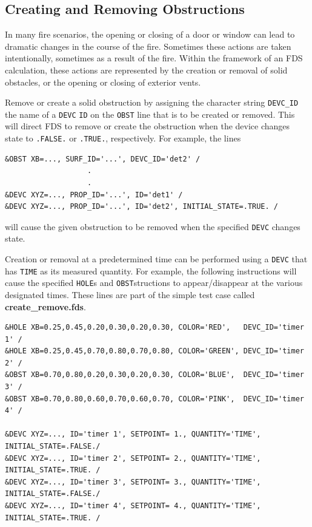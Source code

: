 \documentclass[11pt]{book}
\newcommand{\ct}{\tt\small}
\begin{document}
\subsection{Creating and Removing Obstructions}
\label{info:create_remove}

In many fire scenarios, the opening or closing of a door or window
can lead to dramatic changes in the course of the fire. Sometimes these
actions are taken intentionally, sometimes as a result of the fire.
Within the framework of an FDS calculation, these actions are
represented by the creation or removal of solid obstacles, or the
opening or closing of exterior vents.

Remove or create a solid obstruction by assigning the character string {\ct DEVC\_ID} the name of
a {\ct DEVC} {\ct ID} on the {\ct OBST} line that is to be created or removed.  This will direct
FDS to remove or create the obstruction when
the device changes state to {\ct .FALSE.} or {\ct .TRUE.}, respectively. For example, the lines

\footnotesize
\begin{verbatim}
&OBST XB=..., SURF_ID='...', DEVC_ID='det2' /
                   .
                   .
&DEVC XYZ=..., PROP_ID='...', ID='det1' /
&DEVC XYZ=..., PROP_ID='...', ID='det2', INITIAL_STATE=.TRUE. /
\end{verbatim}
\normalsize

\noindent
will cause the given obstruction to be removed when the specified {\ct DEVC} changes state.

Creation or removal at a predetermined time can be performed using a {\ct DEVC} that has {\ct TIME} as
its measured quantity. For example, the following instructions will cause the specified {\ct HOLE}s and {\ct OBST}structions to
appear/disappear at the various designated times. These lines are part of the simple test case called {\bf create\_remove.fds}.

\footnotesize
\begin{verbatim}
&HOLE XB=0.25,0.45,0.20,0.30,0.20,0.30, COLOR='RED',   DEVC_ID='timer 1' /
&HOLE XB=0.25,0.45,0.70,0.80,0.70,0.80, COLOR='GREEN', DEVC_ID='timer 2' /
&OBST XB=0.70,0.80,0.20,0.30,0.20,0.30, COLOR='BLUE',  DEVC_ID='timer 3' /
&OBST XB=0.70,0.80,0.60,0.70,0.60,0.70, COLOR='PINK',  DEVC_ID='timer 4' /

&DEVC XYZ=..., ID='timer 1', SETPOINT= 1., QUANTITY='TIME', INITIAL_STATE=.FALSE./
&DEVC XYZ=..., ID='timer 2', SETPOINT= 2., QUANTITY='TIME', INITIAL_STATE=.TRUE. /
&DEVC XYZ=..., ID='timer 3', SETPOINT= 3., QUANTITY='TIME', INITIAL_STATE=.FALSE./
&DEVC XYZ=..., ID='timer 4', SETPOINT= 4., QUANTITY='TIME', INITIAL_STATE=.TRUE. /
\end{verbatim}
\normalsize
\end{document}
